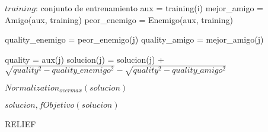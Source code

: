 \documentclass{article}
\begin{document}
\begin{algorithm}
\begin{algorithmic}[1]
    \REQUIRE $training$: conjunto de entrenamiento
	\STATE aux = training(i)
	\STATE mejor\_amigo = Amigo(aux, training)
	\STATE peor\_enemigo = Enemigo(aux, training)

		\STATE quality\_enemigo = peor\_enemigo(j) 
		\STATE quality\_amigo = mejor\_amigo(j)

		\STATE quality = aux(j)
		\STATE solucion(j) = solucion(j) + $\sqrt{quality^2 - quality\_enemigo^2} - \sqrt{quality^2 - quality\_amigo^2}$
	\ENDFOR
    \ENDFOR

     \STATE $Normalization_{overmax}(solucion)$

    \RETURN $solucion, fObjetivo(solucion)$
\end{algorithmic}
\caption{RELIEF}
\end{algorithm}
\end{document}
